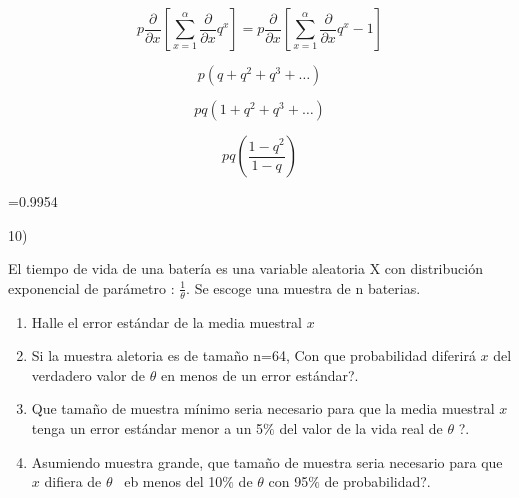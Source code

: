 \documentclass[10pt,a4paper]{article}
\begin{document}
\begin{justify}
\[  \]  \[ p\frac{ \partial }{ \partial x} \left[  \sum _{x=1}^{ \alpha }\frac{ \partial }{ \partial x}q^{x} \right] =p\frac{ \partial }{ \partial x} \left[  \sum _{x=1}^{ \alpha }\frac{ \partial }{ \partial x}q^{x}-1 \right]  \] 
\end{justify}\par

\begin{justify}
\[  \]  \[ p \left( q+q^{2}+q^{3}+ \ldots  \right)  \] 
\end{justify}\par

\begin{justify}
\[  \]  \[ pq \left( 1+q^{2}+q^{3}+ \ldots  \right)  \] 
\end{justify}\par

\begin{justify}
\[  \]  \[ pq \left( \frac{1-q^{2}}{1-q} \right)  \] 
\end{justify}\par

\begin{justify}
=0.9954
\end{justify}\par


10) \begin{justify}
	El tiempo de vida de una batería es una variable aleatoria X con distribución exponencial de parámetro : \( \frac{1}{ \theta }.  \) Se escoge una muestra de n baterias.
\end{justify}\par

\begin{enumerate}
	\item Halle el error estándar de la media muestral  \( x \) \par
	
	\item Si la muestra aletoria es de tamaño n=64, Con que probabilidad diferirá  \( x \)  del verdadero valor de  \(  \theta  \)  en menos de un error estándar?.\par
	
	\item Que tamaño de muestra mínimo seria necesario para que la media muestral  \( x \)  tenga un error estándar menor a un 5$\%$  del valor de la vida real de  \(  \theta  \) ?.\par
	
	\item Asumiendo muestra grande, que tamaño de muestra seria necesario para que  \( x \)  difiera de  \(  \theta  \) \ eb  menos del 10$\%$  de  \(  \theta  \)  con 95$\%$  de probabilidad?.
\end{enumerate}\par
\end{document}
